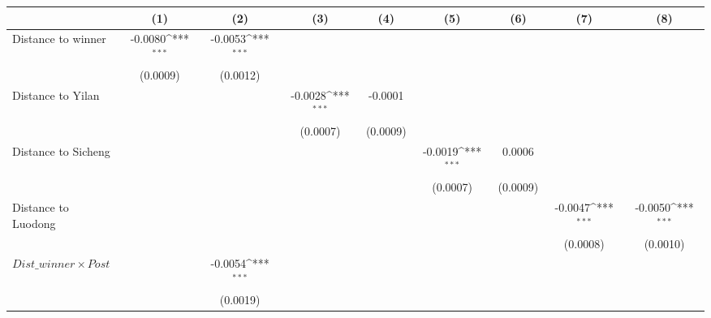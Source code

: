 {
\def\sym#1{\ifmmode^{#1}\else\(^{#1}\)\fi}
\begin{tabular}{l*{8}{c}}
\toprule
                &\multicolumn{1}{c}{(1)}         &\multicolumn{1}{c}{(2)}         &\multicolumn{1}{c}{(3)}         &\multicolumn{1}{c}{(4)}         &\multicolumn{1}{c}{(5)}         &\multicolumn{1}{c}{(6)}         &\multicolumn{1}{c}{(7)}         &\multicolumn{1}{c}{(8)}         \\
\midrule
Distance to winner&  -0.0080\sym{***}&  -0.0053\sym{***}&                  &                  &                  &                  &                  &                  \\
                & (0.0009)         & (0.0012)         &                  &                  &                  &                  &                  &                  \\
\addlinespace
Distance to Yilan&                  &                  &  -0.0028\sym{***}&  -0.0001         &                  &                  &                  &                  \\
                &                  &                  & (0.0007)         & (0.0009)         &                  &                  &                  &                  \\
\addlinespace
Distance to Sicheng&                  &                  &                  &                  &  -0.0019\sym{***}&   0.0006         &                  &                  \\
                &                  &                  &                  &                  & (0.0007)         & (0.0009)         &                  &                  \\
\addlinespace
Distance to Luodong&                  &                  &                  &                  &                  &                  &  -0.0047\sym{***}&  -0.0050\sym{***}\\
                &                  &                  &                  &                  &                  &                  & (0.0008)         & (0.0010)         \\
\addlinespace
$ Dist\_winner \times Post$&                  &  -0.0054\sym{***}&                  &                  &                  &                  &                  &                  \\
                &                  & (0.0019)         &                  &                  &                  &                  &                  &                  \\

\end{tabular}}
